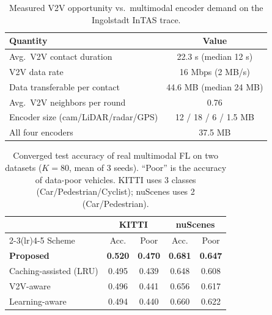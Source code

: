 
\begin{table}[t]
\centering
\caption{Measured V2V opportunity vs.\ multimodal encoder demand on the
Ingolstadt InTAS trace.}
\label{tab:motivation}
\setlength{\tabcolsep}{5pt}
\begin{tabular}{lc}
\toprule
Quantity & Value \\
\midrule
Avg.\ V2V contact duration         & 22.3 s (median 12 s) \\
V2V data rate                      & 16 Mbps (2 MB/s) \\
Data transferable per contact      & 44.6 MB (median 24 MB) \\
Avg.\ V2V neighbors per round      & 0.76 \\
\midrule
Encoder size (cam/LiDAR/radar/GPS) & 12 / 18 / 6 / 1.5 MB \\
All four encoders                  & 37.5 MB \\
\bottomrule
\end{tabular}
\end{table}

\begin{table}[t]
\centering
\caption{Converged test accuracy of real multimodal FL on two datasets ($K{=}80$,
mean of 3 seeds). ``Poor'' is the accuracy of data-poor vehicles. KITTI uses 3
classes (Car/Pedestrian/Cyclist); nuScenes uses 2 (Car/Pedestrian).}
\label{tab:main_results}
\setlength{\tabcolsep}{4pt}
\begin{tabular}{l cc cc}
\toprule
 & \multicolumn{2}{c}{KITTI} & \multicolumn{2}{c}{nuScenes} \\
\cmidrule(lr){2-3}\cmidrule(lr){4-5}
Scheme & Acc. & Poor & Acc. & Poor \\
\midrule
\textbf{Proposed}        & \textbf{0.520} & \textbf{0.470} & \textbf{0.681} & \textbf{0.647} \\
Caching-assisted (LRU)   & 0.495 & 0.439 & 0.648 & 0.608 \\
V2V-aware                & 0.496 & 0.441 & 0.656 & 0.617 \\
Learning-aware           & 0.494 & 0.440 & 0.660 & 0.622 \\
\bottomrule
\end{tabular}
\end{table}

